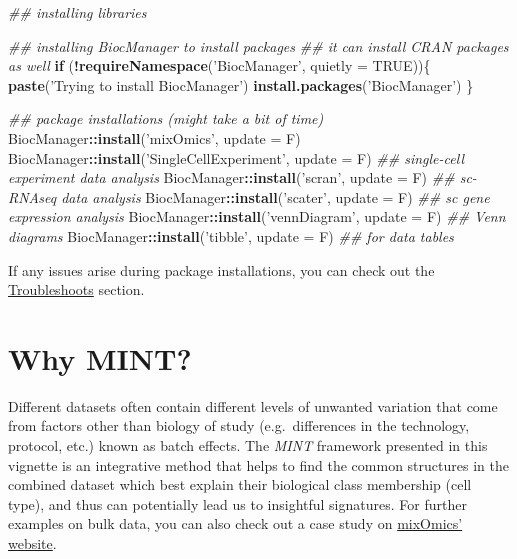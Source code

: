 \documentclass[]{book}
\newenvironment{Shaded}{\begin{snugshade}}{\end{snugshade}}
\newcommand{\CommentTok}[1]{\textcolor[rgb]{0.56,0.35,0.01}{\textit{#1}}}
\newcommand{\ControlFlowTok}[1]{\textcolor[rgb]{0.13,0.29,0.53}{\textbf{#1}}}
\newcommand{\DataTypeTok}[1]{\textcolor[rgb]{0.13,0.29,0.53}{#1}}
\newcommand{\KeywordTok}[1]{\textcolor[rgb]{0.13,0.29,0.53}{\textbf{#1}}}
\newcommand{\NormalTok}[1]{#1}
\newcommand{\OperatorTok}[1]{\textcolor[rgb]{0.81,0.36,0.00}{\textbf{#1}}}
\newcommand{\OtherTok}[1]{\textcolor[rgb]{0.56,0.35,0.01}{#1}}
\newcommand{\StringTok}[1]{\textcolor[rgb]{0.31,0.60,0.02}{#1}}
\theoremstyle{definition}
\theoremstyle{definition}
\theoremstyle{definition}
\theoremstyle{remark}
\begin{document}
\begin{Shaded}
\begin{Highlighting}[]
\CommentTok{## installing libraries}

\CommentTok{## installing BiocManager to install packages}
\CommentTok{## it can install CRAN packages as well}
\ControlFlowTok{if}\NormalTok{ (}\OperatorTok{!}\KeywordTok{requireNamespace}\NormalTok{(}\StringTok{'BiocManager'}\NormalTok{, }\DataTypeTok{quietly =} \OtherTok{TRUE}\NormalTok{))\{}
  \KeywordTok{paste}\NormalTok{(}\StringTok{'Trying to install BiocManager'}\NormalTok{)}
  \KeywordTok{install.packages}\NormalTok{(}\StringTok{'BiocManager'}\NormalTok{)}
\NormalTok{\}}

\CommentTok{## package installations (might take a bit of time)}
\NormalTok{BiocManager}\OperatorTok{::}\KeywordTok{install}\NormalTok{(}\StringTok{'mixOmics'}\NormalTok{, }\DataTypeTok{update =}\NormalTok{ F)}
\NormalTok{BiocManager}\OperatorTok{::}\KeywordTok{install}\NormalTok{(}\StringTok{'SingleCellExperiment'}\NormalTok{, }\DataTypeTok{update =}\NormalTok{ F) }\CommentTok{## single-cell experiment data analysis}
\NormalTok{BiocManager}\OperatorTok{::}\KeywordTok{install}\NormalTok{(}\StringTok{'scran'}\NormalTok{, }\DataTypeTok{update =}\NormalTok{ F) }\CommentTok{## sc-RNAseq data analysis}
\NormalTok{BiocManager}\OperatorTok{::}\KeywordTok{install}\NormalTok{(}\StringTok{'scater'}\NormalTok{, }\DataTypeTok{update =}\NormalTok{ F) }\CommentTok{## sc gene expression analysis}
\NormalTok{BiocManager}\OperatorTok{::}\KeywordTok{install}\NormalTok{(}\StringTok{'vennDiagram'}\NormalTok{, }\DataTypeTok{update =}\NormalTok{ F) }\CommentTok{## Venn diagrams}
\NormalTok{BiocManager}\OperatorTok{::}\KeywordTok{install}\NormalTok{(}\StringTok{'tibble'}\NormalTok{, }\DataTypeTok{update =}\NormalTok{ F) }\CommentTok{## for data tables}
\end{Highlighting}
\end{Shaded}

If any issues arise during package installations, you can check out the
\protect\hyperlink{troubleshoots}{Troubleshoots} section.

\hypertarget{why-mint}{%
\section{Why MINT?}\label{why-mint}}

Different datasets often contain different levels of unwanted variation
that come from factors other than biology of study (e.g.~differences in
the technology, protocol, etc.) known as batch effects. The \emph{MINT}
framework presented in this vignette is an integrative method that helps
to find the common structures in the combined dataset which best explain
their biological class membership (cell type), and thus can potentially
lead us to insightful signatures. For further examples on bulk data, you
can also check out a case study on
\href{http://mixomics.org/mixmint/stemcells-example/}{mixOmics'
website}.
\end{document}

